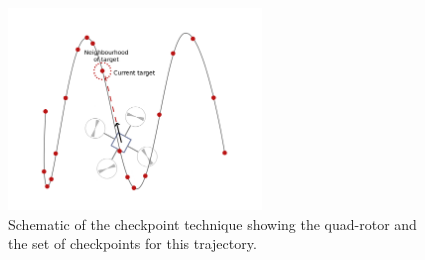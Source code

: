 \documentclass[hidelinks,BTech]{iitmdiss}
\begin{document}
\begin{figure}[H]
  \centering
    \includegraphics[width=0.6\textwidth]{checkpoint.png}
    \caption{Schematic of the checkpoint technique showing the quad-rotor and the set of checkpoints for this trajectory.}
\end{figure}
\end{document}

